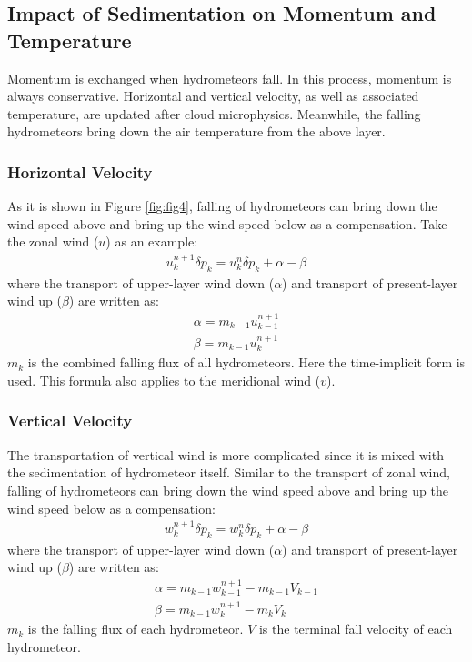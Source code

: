 \documentclass[letterpaper,titlepage,10pt]{article}
\numberwithin{equation}{section}
\begin{document}

\subsection{Impact of Sedimentation on Momentum and Temperature}

Momentum is exchanged when hydrometeors fall. In this process, momentum is always conservative. Horizontal and vertical velocity, as well as associated temperature, are updated after cloud microphysics. Meanwhile, the falling hydrometeors bring down the air temperature from the above layer.


\subsubsection*{Horizontal Velocity}

As it is shown in Figure \ref{fig:fig4}, falling of hydrometeors can bring down the wind speed above and bring up the wind speed below as a compensation. Take the zonal wind ($u$) as an example:
\begin{gather}
	u^{n+1}_k \delta p_k = u^n_k \delta p_k + \alpha - \beta
\end{gather}
where the transport of upper-layer wind down ($\alpha$) and transport of present-layer wind up ($\beta$) are written as:
\begin{gather}
	\alpha = m_{k-1} u^{n+1}_{k-1} \\
	\beta = m_{k-1} u^{n+1}_k
\end{gather}
$m_k$ is the combined falling flux of all hydrometeors. Here the time-implicit form is used. This formula also applies to the meridional wind ($v$).


\subsubsection*{Vertical Velocity}

The transportation of vertical wind is more complicated since it is mixed with the sedimentation of hydrometeor itself. Similar to the transport of zonal wind, falling of hydrometeors can bring down the wind speed above and bring up the wind speed below as a compensation:
\begin{gather}
	w^{n+1}_k \delta p_k = w^n_k \delta p_k + \alpha - \beta
\end{gather}
where the transport of upper-layer wind down ($\alpha$) and transport of present-layer wind up ($\beta$) are written as:
\begin{gather}
	\alpha = m_{k-1} w^{n+1}_{k-1} - m_{k-1} V_{k-1} \\
	\beta = m_{k-1} w^{n+1}_k - m_k V_k
\end{gather}
$m_k$ is the falling flux of each hydrometeor. $V$ is the terminal fall velocity of each hydrometeor.
\end{document}
